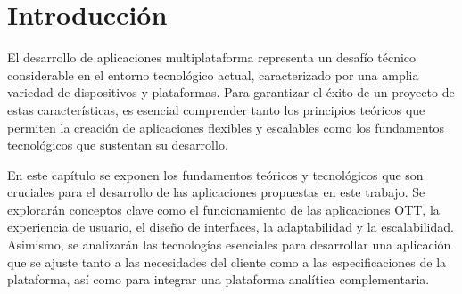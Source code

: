 \section{Introducción}
\label{sec:introduccion_fundamentos}
El desarrollo de aplicaciones multiplataforma representa un desafío técnico considerable en el entorno 
tecnológico actual, caracterizado por una amplia variedad de dispositivos y plataformas. Para garantizar 
el éxito de un proyecto de estas características, es esencial comprender tanto los principios teóricos que 
permiten la creación de aplicaciones flexibles y escalables como los fundamentos tecnológicos que sustentan su 
desarrollo.

En este capítulo se exponen los fundamentos teóricos y tecnológicos que son cruciales para el desarrollo de las 
aplicaciones propuestas en este trabajo. Se explorarán conceptos clave como el funcionamiento de las aplicaciones 
OTT, la experiencia de usuario, el diseño de interfaces, la adaptabilidad y la escalabilidad. Asimismo, se analizarán 
las tecnologías esenciales para desarrollar una aplicación que se ajuste tanto a las necesidades del cliente 
como a las especificaciones de la plataforma, así como para integrar una plataforma analítica complementaria.